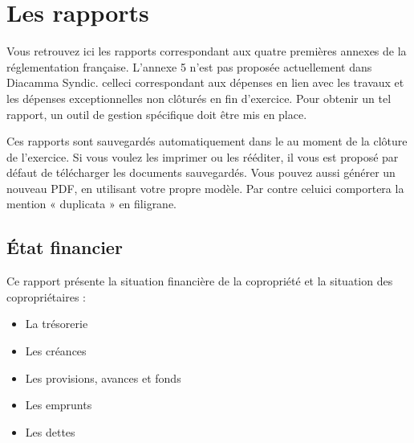 \documentclass[a4paper,10pt,oneside,french]{sphinxmanual}
\begin{document}
\sphinxstepscope


\section{Les rapports}
\label{\detokenize{condominium/report:les-rapports}}\label{\detokenize{condominium/report::doc}}
\sphinxAtStartPar
Vous retrouvez ici les rapports correspondant aux quatre premières annexes de la réglementation française.
L’annexe 5 n’est pas proposée actuellement dans Diacamma Syndic. celle\sphinxhyphen{}ci correspondant aux dépenses en lien avec les travaux et les dépenses exceptionnelles non clôturés en fin d’exercice. Pour obtenir un tel rapport, un outil de gestion spécifique doit être mis en place.

\sphinxAtStartPar
Ces rapports sont sauvegardés automatiquement dans le  au moment de la clôture de l’exercice.
Si vous voulez les imprimer ou les rééditer, il vous est proposé par défaut de télécharger les documents sauvegardés.
Vous pouvez aussi générer un nouveau PDF, en utilisant votre propre modèle.
Par contre celui\sphinxhyphen{}ci comportera la mention « duplicata » en filigrane.


\subsection{État financier}
\label{\detokenize{condominium/report:etat-financier}}
\sphinxAtStartPar
Ce rapport présente la situation financière de la copropriété et la situation des copropriétaires :
\begin{itemize}
\item {} 
\sphinxAtStartPar
La trésorerie

\item {} 
\sphinxAtStartPar
Les créances

\item {} 
\sphinxAtStartPar
Les provisions, avances et fonds

\item {} 
\sphinxAtStartPar
Les emprunts

\item {} 
\sphinxAtStartPar
Les dettes

\end{itemize}
\end{document}
